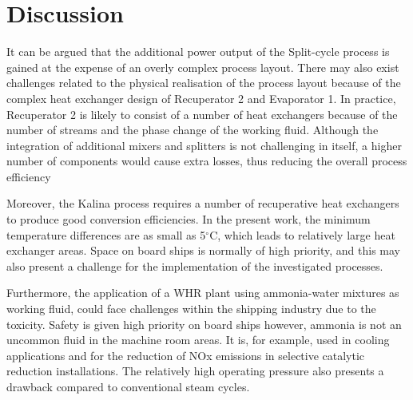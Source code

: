 \documentclass[review,3p]{elsarticle}
\begin{document}







\section{Discussion}
\label{sec:discussion}
It can be argued that the additional power output of the Split-cycle process is gained at the expense of an overly complex process layout. There may also exist challenges related to the physical realisation of the process layout because of the complex heat exchanger design of Recuperator 2 and Evaporator 1. In practice, Recuperator 2 is likely to consist of a number of heat exchangers because of the number of streams and the phase change of the working fluid. Although the integration of additional mixers and splitters is not challenging in itself, a higher number of components would cause extra losses, thus reducing the overall process efficiency 



Moreover, the Kalina process requires a number of recuperative heat exchangers to produce good conversion efficiencies. In the present work, the minimum temperature differences are as small as 5$^{\circ}$C, which leads to relatively large heat exchanger areas. Space on board ships is normally of high priority, and this may also present a challenge for the implementation of the investigated processes. 



Furthermore, the application of a WHR plant using ammonia-water mixtures as working fluid, could face challenges within the shipping industry due to the toxicity. Safety is given high priority on board ships however, ammonia is not an uncommon fluid in the machine room areas. It is, for example, used in cooling applications and for the reduction of NOx emissions in selective catalytic reduction installations. The relatively high operating pressure also presents a drawback compared to conventional steam cycles. 
\end{document}
